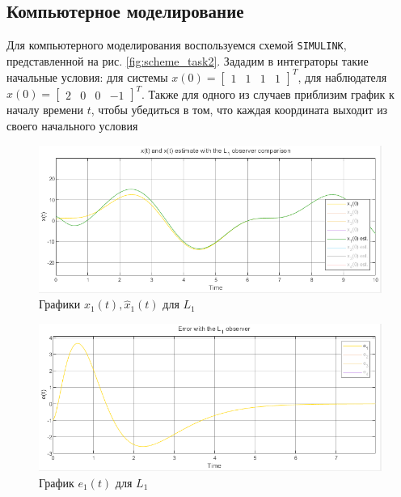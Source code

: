 \documentclass[a4paper, 12pt]{article}
\begin{document}
    \subsection{Компьютерное моделирование}
    Для компьютерного моделирования воспользуемся схемой \texttt{SIMULINK},
    представленной на рис. \ref{fig:scheme_task2}. Зададим в интеграторы
    такие начальные условия:
    для системы $x(0)=\begin{bmatrix}
        1 &1 &1 &1
    \end{bmatrix}^T$, для наблюдателя $\hat{x}(0)=\begin{bmatrix}
        2 &0 &0 &-1
    \end{bmatrix}^T$. Также для одного из случаев приблизим график к началу времени $t$,
    чтобы убедиться в том, что каждая координата выходит из своего начального условия
    \begin{figure}[H]
        \centering
        \includegraphics[scale=0.7]{2task_x1comp_L1.png}
        \captionsetup{skip=0pt}
        \caption{Графики $x_1(t),\hat{x}_1(t)$ для $L_1$}
        \label{fig:2task_x1comp_L1}
    \end{figure}
    \begin{figure}[H]
        \centering
        \includegraphics[scale=0.7]{2task_e1_L1.png}
        \captionsetup{skip=0pt}
        \caption{График $e_1(t)$ для $L_1$}
        \label{fig:2task_e1_L1}
    \end{figure}
\end{document}
